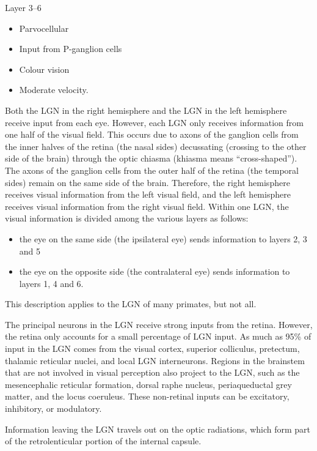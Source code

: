 \documentclass[]{book}
\providecommand{\tightlist}{%
  \setlength{\itemsep}{0pt}\setlength{\parskip}{0pt}}
\begin{document}
Layer 3--6

\begin{itemize}
\tightlist
\item
  Parvocellular
\item
  Input from P-ganglion cells
\item
  Colour vision
\item
  Moderate velocity.
\end{itemize}

Both the LGN in the right hemisphere and the LGN in the left hemisphere receive input from each eye. However, each LGN only receives information from one half of the visual field. This occurs due to axons of the ganglion cells from the inner halves of the retina (the nasal sides) decussating (crossing to the other side of the brain) through the optic chiasma (khiasma means ``cross-shaped''). The axons of the ganglion cells from the outer half of the retina (the temporal sides) remain on the same side of the brain. Therefore, the right hemisphere receives visual information from the left visual field, and the left hemisphere receives visual information from the right visual field. Within one LGN, the visual information is divided among the various layers as follows:

\begin{itemize}
\tightlist
\item
  the eye on the same side (the ipsilateral eye) sends information to layers 2, 3 and 5
\item
  the eye on the opposite side (the contralateral eye) sends information to layers 1, 4 and 6.
\end{itemize}

This description applies to the LGN of many primates, but not all.

The principal neurons in the LGN receive strong inputs from the retina. However, the retina only accounts for a small percentage of LGN input. As much as 95\% of input in the LGN comes from the visual cortex, superior colliculus, pretectum, thalamic reticular nuclei, and local LGN interneurons. Regions in the brainstem that are not involved in visual perception also project to the LGN, such as the mesencephalic reticular formation, dorsal raphe nucleus, periaqueductal grey matter, and the locus coeruleus. These non-retinal inputs can be excitatory, inhibitory, or modulatory.

Information leaving the LGN travels out on the optic radiations, which form part of the retrolenticular portion of the internal capsule.
\end{document}
